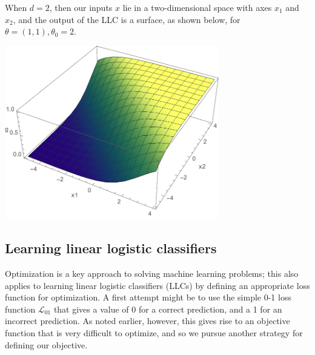 
When $d = 2$, then our inputs $x$ lie in a two-dimensional space with
axes $x_1$ and $x_2$, and the output of the LLC is a surface, as shown
below, for $\theta = (1, 1), \theta_0 = 2$.

\includegraphics[width=0.7\textwidth]{figures/logreg3d}


\subsection{Learning linear logistic classifiers}

\label{logistic}

Optimization is a key approach to solving machine learning
problems; this also applies to learning linear logistic classifiers (LLCs) by
defining an appropriate loss function for optimization.
A first attempt might be to use the simple 0-1 loss function $\mathcal{L}_{01}$
that gives a value of 0 for a correct prediction, and a 1 for an
incorrect prediction. As noted earlier, however, this gives rise
to an objective function that is very difficult to optimize, and so
we pursue another strategy for defining our objective.

